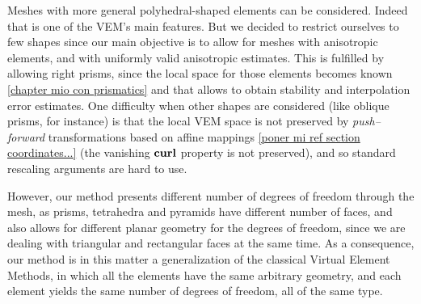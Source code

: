 {\color{orange}
Meshes with more general polyhedral-shaped elements can be considered. 
Indeed that is one of the VEM's main features. But we decided to restrict
ourselves to few 
shapes since our main objective is to allow for meshes with anisotropic elements, 
and with uniformly valid anisotropic 
estimates. This is fulfilled by allowing right prisms, since the local space for
those elements becomes known \ref{chapter mio con prismatics} 
and that allows to obtain stability and interpolation error estimates. One 
difficulty when other shapes are considered (like
oblique prisms, for instance) is that the local VEM space is not preserved by 
\emph{push--forward} transformations based on affine mappings \ref{poner mi ref section coordinates...} 
(the vanishing ${\bf curl}$ 
property is not preserved), and so standard rescaling arguments are hard to use.  

However, our method presents different number of degrees of freedom through the 
mesh, as prisms, tetrahedra and pyramids have different number of faces, and also 
allows for different planar geometry for the degrees of freedom, since we are dealing
with triangular and rectangular faces at the same time. As a consequence, our 
method is in this matter a generalization of the classical Virtual Element Methods,
in which all the elements have the same arbitrary geometry, and each element yields
the same number of degrees of freedom, all of the same type.}
